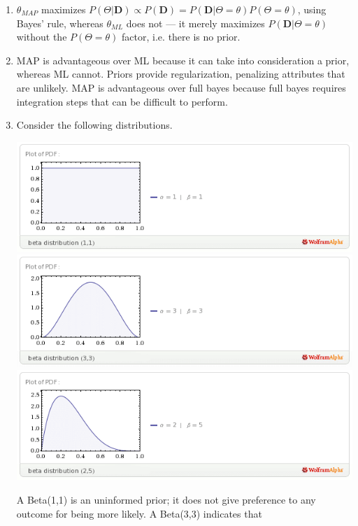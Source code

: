 \documentclass{article}
\begin{document}
\begin{enumerate}
\item $\theta_{MAP}$ maximizes $P(\Theta|\mathbf D)\propto P(\mathbf
  D)=P(\mathbf D | \Theta = \theta)P(\Theta = \theta)$, using Bayes'
  rule, whereas $\theta_{ML}$ does not --- it merely maximizes
  $P(\mathbf D | \Theta = \theta)$ without the $P(\Theta=\theta)$
  factor, i.e. there is no prior.
\item MAP is advantageous over ML because it can take into
  consideration a prior, whereas ML cannot. Priors provide
  regularization, penalizing attributes that are unlikely.  MAP is
  advantageous over full bayes because full bayes requires integration
  steps that can be difficult to perform.
\item
  Consider the following distributions.
  \begin{center}
    \includegraphics[scale=.35]{beta_1_1.png}
    \includegraphics[scale=.35]{beta_3_3.png}
    \includegraphics[scale=.35]{beta_2_5.png}
  \end{center}
  A Beta(1,1) is an uninformed prior; it does not give preference to
  any outcome for being more likely. A Beta(3,3) indicates that

\end{enumerate}
\end{document}
